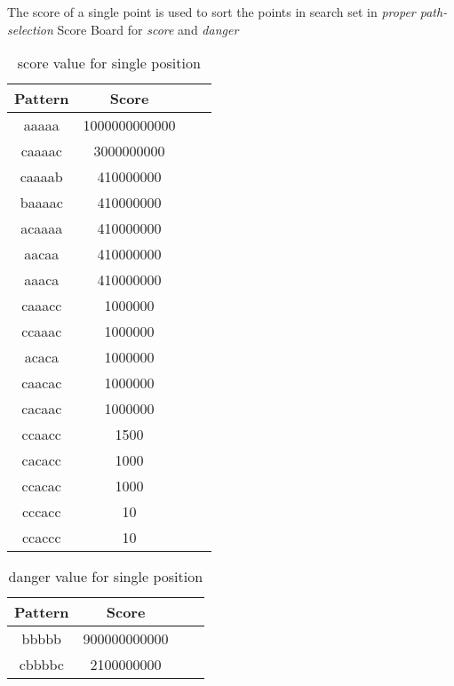 \documentclass[conference]{IEEEtran}
\begin{document}
The score of a single point is used to sort the points in search set in \emph{proper path-selection}
	Score Board for \emph{score} and \emph{danger}
	
	\begin{table}[htb]
	\caption{score value for single position}
	\centering
    \begin{tabular}{cccc}
    \toprule
    Pattern&Score\\
    \midrule
	aaaaa&1000000000000\\
	caaaac&3000000000\\
	caaaab&410000000\\
    baaaac&410000000\\
    acaaaa&410000000\\
    aacaa&410000000\\
    aaaca&410000000\\
    caaacc&1000000\\
    ccaaac&1000000\\
    acaca&1000000\\
    caacac&1000000\\
    cacaac&1000000\\
    ccaacc&1500\\
    cacacc&1000\\
    ccacac&1000\\
    cccacc&10\\
    ccaccc&10\\    
	\bottomrule
	\end{tabular}
	\label{table:1}
	\end{table}
	

	\begin{table}[htb]
	\caption{danger value for single position}
	\centering
    \begin{tabular}{cccc}
    \toprule
    Pattern&Score\\
    \midrule
	bbbbb&900000000000\\
	cbbbbc&2100000000\\
	\bottomrule
	\end{tabular}
	\label{table:1}
	\end{table}
	
\end{document}
